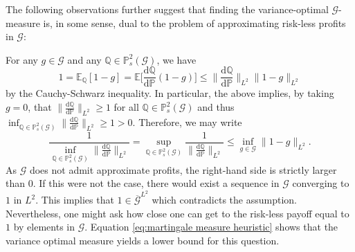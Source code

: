 \documentclass[11pt,a4paper,twoside,openany]{report}
\numberwithin{equation}{section}
\newcommand{\diff}{\mathrm{d}}
\theoremstyle{plain} %
\theoremstyle{definition} %
\theoremstyle{remark} %
\begin{document}
The following observations further suggest that finding the variance-optimal \(\mathcal{G}\)-measure is, in some sense, dual to the problem of approximating risk-less profits in \(\mathcal{G}\):



For any $g\in\mathcal{G}$ and any $\mathbb{Q}\in\mathbb{P}^2_s(\mathcal{G})$, we have
\[
1 = \mathbb{E}_\mathbb{Q}[1-g]
= \mathbb{E}\bigg[\frac{\diff\mathbb{Q}}{\diff\mathbb{P}}(1-g)\bigg]
\leq \|\frac{\diff\mathbb{Q}}{\diff\mathbb{P}}\|_{L^2}\|1-g\|_{L^2}
\]
by the Cauchy-Schwarz inequality. In particular, the above implies, by taking \(g=0\), that \(\|\frac{\diff\mathbb{Q}}{\diff\mathbb{P}}\|_{L^2}\geq 1\) for all \(\mathbb{Q}\in\mathbb{P}^2_s(\mathcal{G})\) and thus \(\inf_{\mathbb{Q}\in\mathbb{P}^2_s(\mathcal{G})}\|\frac{\diff\mathbb{Q}}{\diff\mathbb{P}}\|_{L^2}\geq 1>0\). Therefore, we may write
\begin{equation}\label{eq:martingale measure heuristic}
\frac{1}{\inf\limits_{\mathbb{Q}\in\mathbb{P}^2_s(\mathcal{G})}\|\frac{\diff\mathbb{Q}}{\diff\mathbb{P}}\|_{L^2}}
=
\sup\limits_{\mathbb{Q}\in\mathbb{P}^2_s(\mathcal{G})}\frac{1}{\|\frac{\diff\mathbb{Q}}{\diff\mathbb{P}}\|_{L^2}}
\leq
\inf\limits_{g\in\mathcal{G}}\|1-g\|_{L^2}.
\end{equation}
As \(\mathcal{G}\) does not admit approximate profits, the right-hand side is strictly larger than \(0\). If this were not the case, there would exist a sequence in \(\mathcal{G}\) converging to \(1\) in \(L^2\). This implies that \(1\in\overline{\mathcal{G}}^{L^2}\) which contradicts the assumption. Nevertheless, one might ask how close one can get to the risk-less payoff equal to \(1\) by elements in \(\mathcal{G}\). Equation \eqref{eq:martingale measure heuristic} shows that the variance optimal measure yields a lower bound for this question. 
\end{document}
